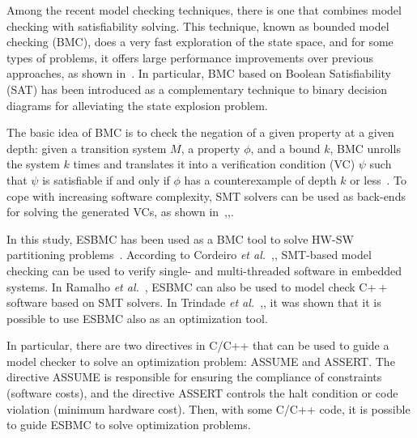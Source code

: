 
Among the recent model checking techniques, there is one that combines model checking with satisﬁability solving. This technique, known as bounded model checking (BMC), does a very fast exploration of the state space, and for some types of problems, it offers large performance improvements over previous approaches, as shown in~\cite{Biere2009}. In particular, BMC based on Boolean Satisfiability (SAT) has been introduced as a complementary technique to binary decision diagrams for alleviating the state explosion problem. 

The basic idea of BMC is to check the negation of a given property at a given depth: given a transition system $M$, a property $\phi$, and a bound $k$, BMC unrolls the system $k$ times and translates it into a verification condition (VC) $\psi$  such that $\psi$ is satisfiable if and only if $\phi$ has a counterexample of depth $k$ or less~\cite{Biere2009}. To cope with increasing software complexity, SMT solvers can be used as back-ends for solving the generated VCs, as shown in~\cite{Armando2009},\cite{Ganai2006},\cite{Cordeiro2012}. 

In this study, ESBMC has been used as a BMC tool to solve HW-SW partitioning problems~\cite{Cordeiro2012}. According to Cordeiro {\it et al.}~\cite{Cordeiro2012},\cite{Cordeiro2011}, SMT-based model checking can be used to verify single- and multi-threaded software in embedded systems. In Ramalho {\it et al.}~\cite{Ramalho2013}, ESBMC can also be used to model check C$++$ software based on SMT solvers. In Trindade {\it et al.}~\cite{Trindade2015},\cite{Trindade2014}, it was shown that it is possible to use ESBMC also as an optimization tool.

In particular, there are two directives in C/C++ that can be used to guide a model checker to solve an optimization problem: ASSUME and ASSERT. The directive ASSUME is responsible for ensuring the compliance of constraints (software costs), and the directive ASSERT controls the halt condition or code violation (minimum hardware cost). Then, with some C/C++ code, it is possible to guide ESBMC to solve optimization problems.

